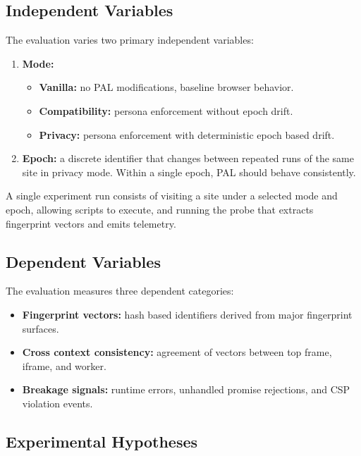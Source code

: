 \documentclass[11pt]{report}
\begin{document}
\subsection{Independent Variables}

The evaluation varies two primary independent variables:

\begin{enumerate}
    \item \textbf{Mode:}
    \begin{itemize}
        \item \textbf{Vanilla:} no PAL modifications, baseline browser behavior.
        \item \textbf{Compatibility:} persona enforcement without epoch drift.
        \item \textbf{Privacy:} persona enforcement with deterministic epoch based drift.
    \end{itemize}

    \item \textbf{Epoch:} a discrete identifier that changes between repeated runs of the same site in privacy mode. Within a single epoch, PAL should behave consistently.
\end{enumerate}

A single experiment run consists of visiting a site under a selected mode and epoch, allowing scripts to execute, and running the probe that extracts fingerprint vectors and emits telemetry.

\subsection{Dependent Variables}

The evaluation measures three dependent categories:

\begin{itemize}
    \item \textbf{Fingerprint vectors:} hash based identifiers derived from major fingerprint surfaces.
    \item \textbf{Cross context consistency:} agreement of vectors between top frame, iframe, and worker.
    \item \textbf{Breakage signals:} runtime errors, unhandled promise rejections, and CSP violation events.
\end{itemize}

\subsection{Experimental Hypotheses}
\end{document}
